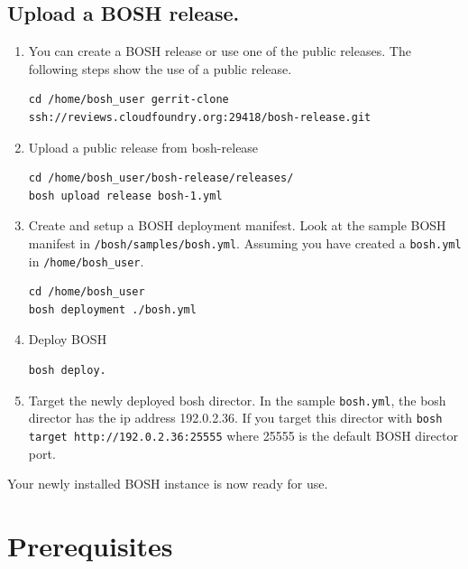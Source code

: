 \subsection{Upload a BOSH release.}
\label{uploadaboshrelease.}

\begin{enumerate}
\item You can create a BOSH release or use one of the public releases. The following steps show the use of a public release. 

\begin{verbatim}
cd /home/bosh_user gerrit-clone ssh://reviews.cloudfoundry.org:29418/bosh-release.git
\end{verbatim}


\item Upload a public release from bosh-release 

\begin{verbatim}
cd /home/bosh_user/bosh-release/releases/
bosh upload release bosh-1.yml
\end{verbatim}


\item Create and setup a BOSH deployment manifest. Look at the sample BOSH manifest in \texttt{\slash bosh\slash samples\slash bosh.yml}. Assuming you have created a \texttt{bosh.yml} in \texttt{\slash home\slash bosh\_user}.

\begin{verbatim}
cd /home/bosh_user
bosh deployment ./bosh.yml
\end{verbatim}


\item Deploy BOSH

\begin{verbatim}
bosh deploy.
\end{verbatim}


\item Target the newly deployed bosh director. In the sample \texttt{bosh.yml}, the bosh director has the ip address 192.0.2.36. If you target this director with \texttt{bosh target http:/\slash 192.0.2.36:25555} where 25555 is the default BOSH director port.

\end{enumerate}

Your newly installed BOSH instance is now ready for use.

\section{Prerequisites}
\label{prerequisites}

